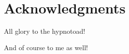 \chapter*{Acknowledgments}
\thispagestyle{empty}

All glory to the hypnotoad!

\vspace{\baselineskip}
And of course to me as well!
